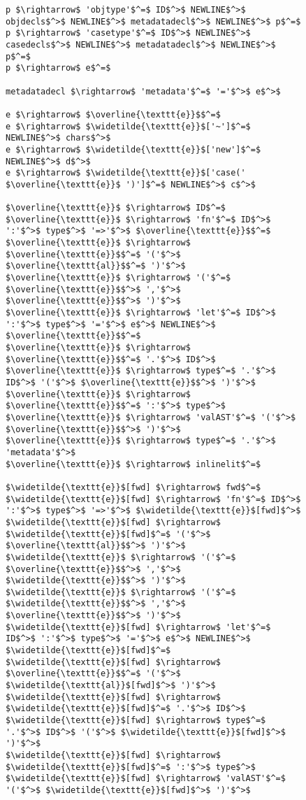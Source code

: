 
\begin{figure}
\begin{lstlisting}[mathescape]
p $\rightarrow$ 'objtype'$^=$ ID$^>$ NEWLINE$^>$ objdecls$^>$ NEWLINE$^>$ metadatadecl$^>$ NEWLINE$^>$ p$^=$
p $\rightarrow$ 'casetype'$^=$ ID$^>$ NEWLINE$^>$ casedecls$^>$ NEWLINE$^>$ metadatadecl$^>$ NEWLINE$^>$ p$^=$
p $\rightarrow$ e$^=$

metadatadecl $\rightarrow$ 'metadata'$^=$ '='$^>$ e$^>$

e $\rightarrow$ $\overline{\texttt{e}}$$^=$
e $\rightarrow$ $\widetilde{\texttt{e}}$['~']$^=$ NEWLINE$^>$ chars$^>$
e $\rightarrow$ $\widetilde{\texttt{e}}$['new']$^=$ NEWLINE$^>$ d$^>$
e $\rightarrow$ $\widetilde{\texttt{e}}$['case(' $\overline{\texttt{e}}$ ')']$^=$ NEWLINE$^>$ c$^>$

$\overline{\texttt{e}}$ $\rightarrow$ ID$^=$
$\overline{\texttt{e}}$ $\rightarrow$ 'fn'$^=$ ID$^>$ ':'$^>$ type$^>$ '=>'$^>$ $\overline{\texttt{e}}$$^=$
$\overline{\texttt{e}}$ $\rightarrow$ $\overline{\texttt{e}}$$^=$ '('$^>$ $\overline{\texttt{al}}$$^=$ ')'$^>$
$\overline{\texttt{e}}$ $\rightarrow$ '('$^=$ $\overline{\texttt{e}}$$^>$ ','$^>$ $\overline{\texttt{e}}$$^>$ ')'$^>$
$\overline{\texttt{e}}$ $\rightarrow$ 'let'$^=$ ID$^>$ ':'$^>$ type$^>$ '='$^>$ e$^>$ NEWLINE$^>$ $\overline{\texttt{e}}$$^=$
$\overline{\texttt{e}}$ $\rightarrow$ $\overline{\texttt{e}}$$^=$ '.'$^>$ ID$^>$
$\overline{\texttt{e}}$ $\rightarrow$ type$^=$ '.'$^>$ ID$^>$ '('$^>$ $\overline{\texttt{e}}$$^>$ ')'$^>$
$\overline{\texttt{e}}$ $\rightarrow$ $\overline{\texttt{e}}$$^=$ ':'$^>$ type$^>$
$\overline{\texttt{e}}$ $\rightarrow$ 'valAST'$^=$ '('$^>$ $\overline{\texttt{e}}$$^>$ ')'$^>$
$\overline{\texttt{e}}$ $\rightarrow$ type$^=$ '.'$^>$ 'metadata'$^>$
$\overline{\texttt{e}}$ $\rightarrow$ inlinelit$^=$

$\widetilde{\texttt{e}}$[fwd] $\rightarrow$ fwd$^=$
$\widetilde{\texttt{e}}$[fwd] $\rightarrow$ 'fn'$^=$ ID$^>$ ':'$^>$ type$^>$ '=>'$^>$ $\widetilde{\texttt{e}}$[fwd]$^>$
$\widetilde{\texttt{e}}$[fwd] $\rightarrow$ $\widetilde{\texttt{e}}$[fwd]$^=$ '('$^>$ $\overline{\texttt{al}}$$^>$ ')'$^>$
$\widetilde{\texttt{e}}$ $\rightarrow$ '('$^=$ $\overline{\texttt{e}}$$^>$ ','$^>$ $\widetilde{\texttt{e}}$$^>$ ')'$^>$
$\widetilde{\texttt{e}}$ $\rightarrow$ '('$^=$ $\widetilde{\texttt{e}}$$^>$ ','$^>$ $\overline{\texttt{e}}$$^>$ ')'$^>$
$\widetilde{\texttt{e}}$[fwd] $\rightarrow$ 'let'$^=$ ID$^>$ ':'$^>$ type$^>$ '='$^>$ e$^>$ NEWLINE$^>$ $\widetilde{\texttt{e}}$[fwd]$^=$
$\widetilde{\texttt{e}}$[fwd] $\rightarrow$ $\overline{\texttt{e}}$$^=$ '('$^>$ $\widetilde{\texttt{al}}$[fwd]$^>$ ')'$^>$
$\widetilde{\texttt{e}}$[fwd] $\rightarrow$ $\widetilde{\texttt{e}}$[fwd]$^=$ '.'$^>$ ID$^>$
$\widetilde{\texttt{e}}$[fwd] $\rightarrow$ type$^=$ '.'$^>$ ID$^>$ '('$^>$ $\widetilde{\texttt{e}}$[fwd]$^>$ ')'$^>$
$\widetilde{\texttt{e}}$[fwd] $\rightarrow$ $\widetilde{\texttt{e}}$[fwd]$^=$ ':'$^>$ type$^>$
$\widetilde{\texttt{e}}$[fwd] $\rightarrow$ 'valAST'$^=$ '('$^>$ $\widetilde{\texttt{e}}$[fwd]$^>$ ')'$^>$


\end{lstlisting}
\end{figure}
